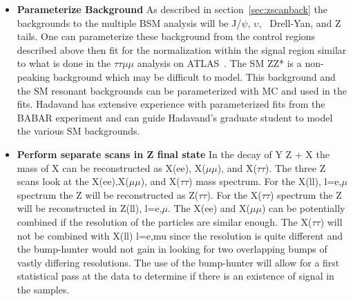 \begin{itemize}[noitemsep,nolistsep,leftmargin=*]
\item[]{{\bf Parameterize Background} %
As described in section~\ref{sec:zscanback} the backgrounds to the multiple BSM analysis  will be J/$\psi$, $\upsilon$, \ttbar\, Drell-Yan, and Z tails.  One can 
parameterize these background from the control regions described above then fit for the normalization within the signal region similar to what is done in the
$\tau\tau \mu \mu$ analysis on ATLAS~\cite{tautaumumu}.  The SM ZZ* is a non-peaking background which may be difficult to model. This background and the SM resonant backgrounds 
can be parameterized with MC and used in the fits. Hadavand has extensive experience with parameterized fits from the BABAR experiment and can guide Hadavand's graduate student to model the various SM backgrounds.}

\item[]{{\bf Perform separate scans in Z final state} %
In the decay of Y \too Z + X the mass of X can be reconstructed as X(ee), X($\mu\mu$), and X($\tau\tau$).  
The three Z scans look at the X(ee),X($\mu\mu$), and X($\tau\tau$) mass spectrum. For the X(ll), l=e,$\mu$ spectrum the Z will be reconstructed as Z($\tau\tau$).  For the X($\tau\tau$) spectrum the Z will be reconstructed in Z(ll), l=e,$\mu$.  
The X(ee) and X($\mu\mu$) can be potentially combined if the resolution of the particles are similar enough.  The X($\tau\tau$) will not be combined with X(ll) l=e,mu since the resolution is quite different and the bump-hunter would not gain in looking for two overlapping bumps of vastly differing resolutions.
The use of the bump-hunter will allow for a first statistical pass at the data to determine if there is an existence of signal in the samples.}




\end{itemize}

